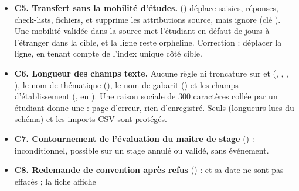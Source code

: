 \documentclass[11pt,a4paper]{article}
\newcommand{\grav}[1]{\textbf{\textcolor{#1}{\textbullet}}}
\newcommand{\maj}{\grav{orange}}
\newcommand{\mineure}{\grav{gray}}
\begin{document}
\begin{itemize}
     () ne lit, pour une
    thématique A2--A4, que la durée de l'année finale et la compare au cumul ; les durées propres
    à A2 et A3, que  met pourtant en avant, ne sont jamais lues.
     (1013--1035), lui, somme les années où l'étudiant a une
    saisie. Avec 10/10/10 jours et un seul stage de 10 jours en A2, le bilan de fin de cursus
    annonce \og objectifs atteints\fg{} (requis 10) ; le tableau de bord étudiant, dès qu'un
    stage A4 s'ajoute, demande 20. Décision de fin de cursus potentiellement faussée.
    Correction : requis = somme des durées de la plage, ou refuser la saisie par année quand une
    plage est définie.
  \item[\maj] \textbf{C5. Transfert sans la mobilité d'études.}
     () déplace saisies,
    réponses, check-lists, fichiers, et supprime les attributions source, mais ignore
     (clé ). Une mobilité validée dans la source
    met l'étudiant \og en défaut\fg{} de jours à l'étranger dans la cible, et la ligne reste
    orpheline. Correction : déplacer la ligne, en tenant compte de l'index unique côté cible.
  \item[\maj] \textbf{C6. Longueur des champs texte.} Aucune règle  ni troncature
    sur  et  (,
    , ,
    ), le nom de thématique (), le
    nom de gabarit () et les champs d'établissement
    (,  en ). Une
    raison sociale de 300 caractères collée par un étudiant donne une
     : page d'erreur, rien d'enregistré. Seuls
     (longueurs lues du schéma) et les imports CSV sont protégés.
  \item[\mineure] \textbf{C7. Contournement de l'évaluation du maître de stage}
    () :  inconditionnel, possible sur un stage
    annulé ou validé, sans événement.
  \item[\mineure] \textbf{C8. Redemande de convention après refus} () :
     et sa date ne sont pas effacés ; la fiche affiche

\end{itemize}
\end{document}
